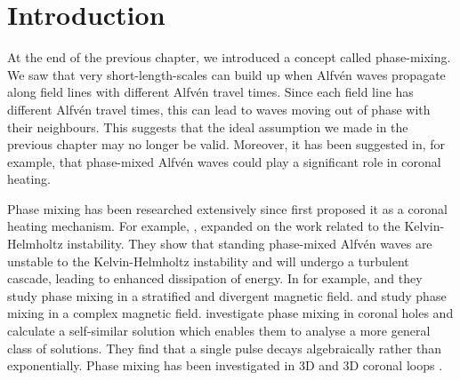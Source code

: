 \section{Introduction}
\label{sec:chap_3_introduction}

At the end of the previous chapter, we introduced a concept called phase-mixing. We saw that very short-length-scales can build up when Alfv\'en waves propagate along field lines with different Alfv\'en travel times. Since each field line has different Alfv\'en travel times, this can lead to waves moving out of phase with their neighbours. This suggests that the ideal assumption we made in the previous chapter may no longer be valid. Moreover, it has been suggested in, for example, \citet{Heyvaerts1983} that phase-mixed Alfv\'en waves could play a significant role in coronal heating.

Phase mixing has been researched extensively since \citet{Heyvaerts1983} first proposed it as a coronal heating mechanism. For example, \citet{Browning1984}, expanded on the \citet{Heyvaerts1983} work related to the Kelvin-Helmholtz instability. They show that standing phase-mixed Alfv\'en waves are unstable to the Kelvin-Helmholtz instability and will undergo a turbulent cascade, leading to enhanced dissipation of energy. In for example, \citet{DeMoortel2002} and \citet{Smith2007} they study phase mixing in a stratified and divergent magnetic field. \citet{Similon1989} and \citet{Howson2019} study phase mixing in a complex magnetic field. \citet{Hood1997,Hood2002} investigate phase mixing in coronal holes and calculate a self-similar solution which enables them to analyse a more general class of solutions. They find that a single pulse decays algebraically rather than exponentially. Phase mixing has been investigated in 3D \citep{Magyar2017} and 3D coronal loops \citep{Pagano2017,Pagano2018}.

